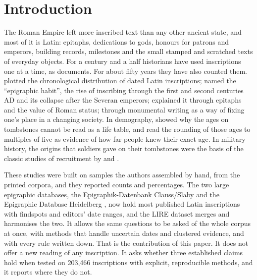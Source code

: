 \documentclass[11pt,a4paper]{article}
\begin{document}
\section{Introduction}
The Roman Empire left more inscribed text than any other ancient state, and most of it is Latin: epitaphs, dedications to gods, honours for patrons and emperors, building records, milestones and the small stamped and scratched texts of everyday objects. For a century and a half historians have used inscriptions one at a time, as documents. For about fifty years they have also counted them. \citet{mrozek1973} plotted the chronological distribution of dated Latin inscriptions; \citet{macmullen1982} named the ``epigraphic habit'', the rise of inscribing through the first and second centuries AD and its collapse after the Severan emperors; \citet{meyer1990} explained it through epitaphs and the value of Roman status; \citet{woolf1996} through monumental writing as a way of fixing one's place in a changing society. In demography, \citet{hopkins1966} showed why the ages on tombstones cannot be read as a life table, and \citet{duncanjones1977} read the rounding of those ages to multiples of five as evidence of how far people knew their exact age. In military history, the origins that soldiers gave on their tombstones were the basis of the classic studies of recruitment by \citet{forni1953} and \citet{mann1983}.

These studies were built on samples the authors assembled by hand, from the printed corpora, and they reported counts and percentages. The two large epigraphic databases, the Epigraphik-Datenbank Clauss/Slaby \citep[EDCS;][]{edcs} and the Epigraphic Database Heidelberg \citep[EDH;][]{edh}, now hold most published Latin inscriptions with findspots and editors' date ranges, and the LIRE dataset \citep{kase2023lire} merges and harmonises the two. It allows the same questions to be asked of the whole corpus at once, with methods that handle uncertain dates and clustered evidence, and with every rule written down. That is the contribution of this paper. It does not offer a new reading of any inscription. It asks whether three established claims hold when tested on 203,466 inscriptions with explicit, reproducible methods, and it reports where they do not.
\end{document}
